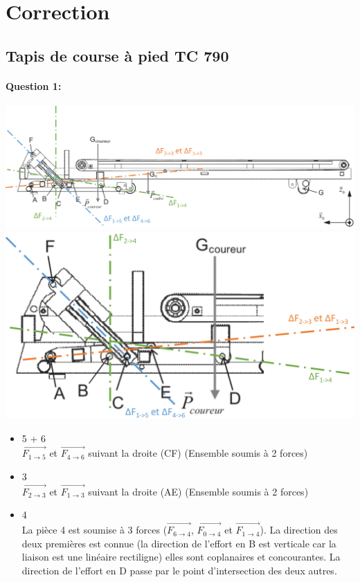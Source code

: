 \pagestyle{correction}

\newpage

\section{Correction}

\subsection{Tapis de course à pied TC 790}

\paragraph{Question 1:}

\begin{center}
 \includegraphics[width=0.9\linewidth]{img/tapis_cor1} \\
 \includegraphics[width=0.6\linewidth]{img/tapis_cor2}
\end{center}

\begin{itemize}
\item 5 + 6 \\
$\overrightarrow{F_{1\rightarrow 5}}$ et $\overrightarrow{F_{4\rightarrow 6}}$ suivant la droite (CF) (Ensemble soumis à 2 forces) \\
\item 3 \\
$\overrightarrow{F_{2\rightarrow 3}}$ et $\overrightarrow{F_{1\rightarrow 3}}$ suivant la droite (AE) (Ensemble soumis à 2 forces) \\
\item 4 \\
La pièce 4 est soumise à 3 forces ($\overrightarrow{F_{6\rightarrow 4}}$, $\overrightarrow{F_{0\rightarrow 4}}$ et $\overrightarrow{F_{1\rightarrow 4}}$). La direction des deux premières est connue (la direction de l'effort en B est verticale car la liaison est une linéaire rectiligne) elles sont coplanaires et concourantes. La direction de l'effort en D passe par le point d'intersection des deux autres.
\end{itemize}


